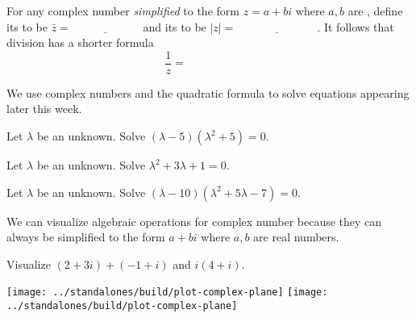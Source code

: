 \documentclass[../main.tex]{subfiles}
\begin{document}
For any complex number \emph{simplified} to the form \(z = a + bi\) where \(a,b\) are \underline{\hspace{3cm}}, define its  to be \(\bar{z} = \underline{\hspace{1in}}\) and its  to be \(|z| = \underline{\hspace{3cm}}\).  It follows that division has a shorter formula
\[
  \frac{1}{z} = \hspace{1in}
\]

\faStar{} We use complex numbers and the quadratic formula to solve equations appearing later this week.
\begin{example}
  Let \(\lambda\) be an unknown. Solve \((\lambda - 5) (\lambda^{2} + 5) = 0\).
\end{example}

\begin{example}
  Let \(\lambda\) be an unknown. Solve \(\lambda^{2} + 3\lambda + 1 = 0\).
\end{example}

\begin{example}
  Let \(\lambda\) be an unknown. Solve \((\lambda - 10) (\lambda^{2} + 5\lambda - 7) = 0\).
\end{example}

We can visualize algebraic operations for complex number because they can always be simplified to the form \(a + bi\) where \(a,b\) are real numbers.

\begin{example}
  Visualize \((2 + 3i) + (-1 + i)\) and \(i (4 + i)\).

  \begin{center}
  \texttt{[image: ../standalones/build/plot-complex-plane]}
  \quad
  \texttt{[image: ../standalones/build/plot-complex-plane]}
  \end{center}
\end{example}
\end{document}
